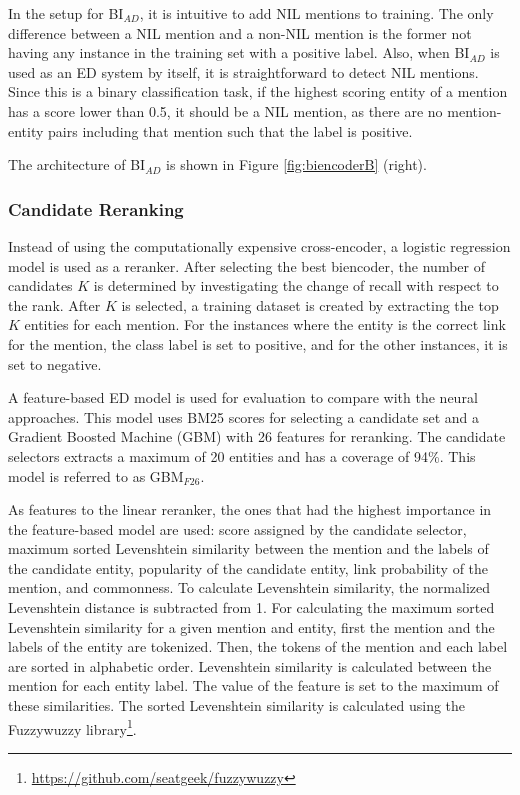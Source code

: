 \documentclass{report}
\theoremstyle{definition}
\theoremstyle{remark}
\begin{document}
In the setup for BI$_{AD}$, it is intuitive to add NIL mentions to training. The only difference between a NIL mention and a non-NIL mention is the former not having any instance in the training set with a positive label. Also, when BI$_{AD}$ is used as an ED system by itself, it is straightforward to detect NIL mentions. Since this is a binary classification task, if the highest scoring entity of a mention has a score lower than 0.5, it should be a NIL mention, as there are no mention-entity pairs including that mention such that the label is positive. 

The architecture of BI$_{AD}$ is shown in Figure \ref{fig:biencoderB} (right).

\subsubsection{Candidate Reranking}
Instead of using the computationally expensive cross-encoder, a logistic regression model is used as a reranker. After selecting the best biencoder, the number of candidates $K$ is determined by investigating the change of recall with respect to the rank. After $K$ is selected, a training dataset is created by extracting the top $K$ entities for each mention. For the instances where the entity is the correct link for the mention, the class label is set to positive, and for the other instances, it is set to negative.

A feature-based ED model is used for evaluation to compare with the neural approaches. This model uses BM25 \cite{bm25} scores for selecting a candidate set and a Gradient Boosted Machine (GBM) \cite{GBM} with 26 features for reranking. The candidate selectors extracts a maximum of 20 entities and has a coverage of 94\%. This model is referred to as GBM$_{F26}$.

As features to the linear reranker, the ones that had the highest importance in the feature-based model are used: score assigned by the candidate selector, maximum sorted Levenshtein similarity between the mention and the labels of the candidate entity, popularity of the candidate entity, link probability of the mention, and commonness. To calculate Levenshtein similarity, the normalized Levenshtein distance is subtracted from 1. For calculating the maximum sorted Levenshtein similarity for a given mention and entity, first the mention and the labels of the entity are tokenized. Then, the tokens of the mention and each label are sorted in alphabetic order. Levenshtein similarity is calculated between the mention for each entity label. The value of the feature is set to the maximum of these similarities. The sorted Levenshtein similarity is calculated using the Fuzzywuzzy library\footnote{\url{https://github.com/seatgeek/fuzzywuzzy}}.
\end{document}
